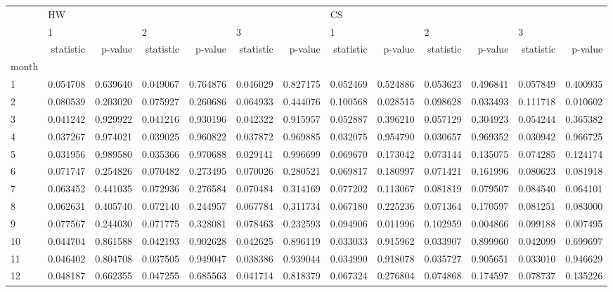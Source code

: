 \begin{tabular}{lrrrrrrrrrrrr}
\toprule
{} & \multicolumn{6}{l}{HW} & \multicolumn{6}{l}{CS} \\
{} & \multicolumn{2}{l}{1} & \multicolumn{2}{l}{2} & \multicolumn{2}{l}{3} & \multicolumn{2}{l}{1} & \multicolumn{2}{l}{2} & \multicolumn{2}{l}{3} \\
{} & statistic &   p-value & statistic &   p-value & statistic &   p-value & statistic &   p-value & statistic &   p-value & statistic &   p-value \\
month &           &           &           &           &           &           &           &           &           &           &           &           \\
\midrule
1     &  0.054708 &  0.639640 &  0.049067 &  0.764876 &  0.046029 &  0.827175 &  0.052469 &  0.524886 &  0.053623 &  0.496841 &  0.057849 &  0.400935 \\
2     &  0.080539 &  0.203020 &  0.075927 &  0.260686 &  0.064933 &  0.444076 &  0.100568 &  0.028515 &  0.098628 &  0.033493 &  0.111718 &  0.010602 \\
3     &  0.041242 &  0.929922 &  0.041216 &  0.930196 &  0.042322 &  0.915957 &  0.052887 &  0.396210 &  0.057129 &  0.304923 &  0.054244 &  0.365382 \\
4     &  0.037267 &  0.974021 &  0.039025 &  0.960822 &  0.037872 &  0.969885 &  0.032075 &  0.954790 &  0.030657 &  0.969352 &  0.030942 &  0.966725 \\
5     &  0.031956 &  0.989580 &  0.035366 &  0.970688 &  0.029141 &  0.996699 &  0.069670 &  0.173042 &  0.073144 &  0.135075 &  0.074285 &  0.124174 \\
6     &  0.071747 &  0.254826 &  0.070482 &  0.273495 &  0.070026 &  0.280521 &  0.069817 &  0.180997 &  0.071421 &  0.161996 &  0.080623 &  0.081918 \\
7     &  0.063452 &  0.441035 &  0.072936 &  0.276584 &  0.070484 &  0.314169 &  0.077202 &  0.113067 &  0.081819 &  0.079507 &  0.084540 &  0.064101 \\
8     &  0.062631 &  0.405740 &  0.072140 &  0.244957 &  0.067784 &  0.311734 &  0.067180 &  0.225236 &  0.071364 &  0.170597 &  0.081251 &  0.083000 \\
9     &  0.077567 &  0.244030 &  0.071775 &  0.328081 &  0.078463 &  0.232593 &  0.094906 &  0.011996 &  0.102959 &  0.004866 &  0.099188 &  0.007495 \\
10    &  0.044704 &  0.861588 &  0.042193 &  0.902628 &  0.042625 &  0.896119 &  0.033033 &  0.915962 &  0.033907 &  0.899960 &  0.042099 &  0.699697 \\
11    &  0.046402 &  0.804708 &  0.037505 &  0.949047 &  0.038386 &  0.939044 &  0.034990 &  0.918078 &  0.035727 &  0.905651 &  0.033010 &  0.946629 \\
12    &  0.048187 &  0.662355 &  0.047255 &  0.685563 &  0.041714 &  0.818379 &  0.067324 &  0.276804 &  0.074868 &  0.174597 &  0.078737 &  0.135226 \\
\bottomrule
\end{tabular}
